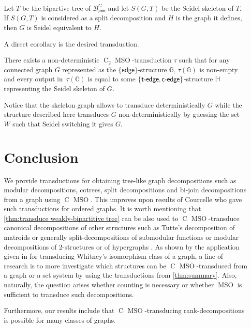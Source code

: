 \documentclass{lmcs} %
\newcommand{\MSO}{\ensuremath{\operatorname{MSO}}\xspace}
\newcommand{\CMSO}[1][]{\ensuremath{\C[#1]{\!\!}\MSO}\xspace}
\newcommand{\C}[1][]{\ensuremath{\operatorname{C}_{#1}}\xspace}
\newcommand{\edge}{\ensuremath{\mathsf{edge}}\xspace}
\newcommand{\tedge}{\ensuremath{\mathsf{t}\text-\mathsf{edge}}\xspace}
\newcommand{\cedge}{\ensuremath{\mathsf{c}\text-\mathsf{edge}}\xspace}
\newcommand{\joinSet}{\ensuremath{\mathcal{B}_\mathsf{join}^G}}
\begin{document}
\begin{lem}\label{lem:seidel-equiv2} Let $T$ be the bipartive tree of $\joinSet$ and let $S(G,T)$ be the Seidel skeleton of $T$. If $S(G,T)$ is considered as
  a split decomposition and $H$ is the graph it defines, then $G$ is Seidel equivalent to $H$.
\end{lem}

A direct corollary is the desired transduction.

\begin{thm}\label{thm:bi-join2}
    There exists a non-deterministic \CMSO[2]-transduction $\tau$
    such that for any connected graph $G$ represented as the $\{\edge\}$-structure $\mathbb{G}$,
    $\tau(\mathbb{G})$ is non-empty
    and every output in~$\tau(\mathbb{G})$ is equal to some $\{\tedge,\cedge\}$-structure $\mathbb{H}$ representing the Seidel skeleton of $G$.
\end{thm}

Notice that the skeleton graph allows to transduce deterministically $G$ while the structure described here transduces $G$ non-deterministically by guessing the
set $W$ such that Seidel switching it gives $G$.

\section{Conclusion}
We provide transductions for obtaining tree-like graph decompositions such as modular decompositions, cotrees, split decompositions and bi-join decompositions
from a graph using \CMSO. This improves upon results of Courcelle \cite{Courcelle96,Courcelle06} who gave such transductions for ordered graphs. It is worth
mentioning that \autoref{thm:transduce weakly-bipartitive tree} can be also used to \CMSO-transduce canonical decompositions of other structures such as Tutte's
decomposition of matroids or generally 
split-decompositions of submodular functions \cite{cunningham1982decomposition} or modular decompositions of $2$-structures \cite{ehrenfeuchtHR1999} or of hypergraphs
\cite{HabibMMZ22}. As shown by the application given in \cite{Courcelle06} for transducing Whitney's isomorphism class of a graph, a line of research is to more
investigate which structures can be \CMSO-transduced from a graph or a set system by using the transductions from \autoref{thm:summary}. Also, naturally, the
question arises whether counting is necessary or whether \MSO is sufficient to transduce such decompositions.

Furthermore, our results include that \CMSO-transducing rank-decompositions is possible for many classes of graphs.
\end{document}
